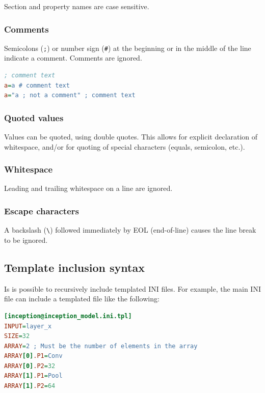 \documentclass[a4paper,11pt,oneside]{article}
\begin{document}
Section and property names are case sensitive.

\subsubsection{Comments}

Semicolons (\lstinline!;!) or number sign (\lstinline!#!) at the beginning or in
 the middle of the line indicate a comment. Comments are ignored.

\begin{lstlisting}[language=ini]
; comment text
a=a # comment text
a="a ; not a comment" ; comment text
\end{lstlisting}

\subsubsection{Quoted values}

Values can be quoted, using double quotes. This allows for explicit declaration
of whitespace, and/or for quoting of special characters (equals, semicolon,
etc.).

\subsubsection{Whitespace}

Leading and trailing whitespace on a line are ignored.

\subsubsection{Escape characters}

A backslash (\lstinline!\!) followed immediately by EOL (end-of-line) causes the
 line break to be ignored.

\subsection{Template inclusion syntax}

Is is possible to recursively include templated INI files. For example, the main
INI file can include a templated file like the following:

\begin{lstlisting}[language=ini]
[inception@inception_model.ini.tpl]
INPUT=layer_x
SIZE=32
ARRAY=2 ; Must be the number of elements in the array
ARRAY[0].P1=Conv
ARRAY[0].P2=32
ARRAY[1].P1=Pool
ARRAY[1].P2=64
\end{lstlisting}
\end{document}
